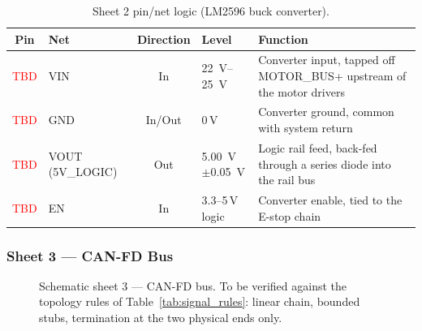 \begin{table}[htbp]
\centering
\caption[Sheet 2 pin/net logic]{Sheet 2 pin/net logic (LM2596 buck converter).}
\label{tab:pins_logic_rail}
\small
\setlength{\tabcolsep}{4pt}
\begin{tabular}{c L{2.6cm} c L{2.4cm} L{5.4cm}}
\toprule
Pin & Net & Direction & Level & Function \\
\midrule
\textcolor{red}{TBD} & VIN & In & \qtyrange{22}{25}{\volt} & Converter input, tapped off MOTOR\_BUS+ upstream of the motor drivers \\
\textcolor{red}{TBD} & GND & In/Out & 0\,V & Converter ground, common with system return \\
\textcolor{red}{TBD} & VOUT (5V\_LOGIC) & Out & \qty{5.00}{\volt} $\pm$\qty{0.05}{\volt} & Logic rail feed, back-fed through a series diode into the rail bus \\
\textcolor{red}{TBD} & EN & In & 3.3--5\,V logic & Converter enable, tied to the E-stop chain \\
\bottomrule
\end{tabular}
\end{table}

\subsubsection{Sheet 3 --- CAN-FD Bus}
\begin{figure}[htbp]
\centering
{}
\caption[Schematic sheet 3: CAN-FD bus]{Schematic sheet 3 --- CAN-FD bus. To be verified against the topology
rules of Table~\ref{tab:signal_rules}: linear chain, bounded stubs, termination
at the two physical ends only.}
\label{fig:sch_can_bus}
\end{figure}

